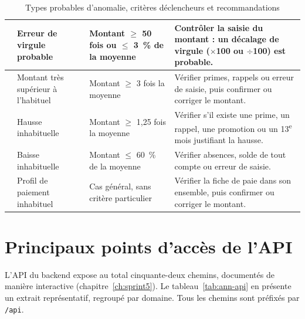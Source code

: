 \begin{table}[H]
\begin{tabularx}{\textwidth}{|>{\centering\arraybackslash}p{0.8cm}|>{\raggedright\arraybackslash}p{3.3cm}|>{\raggedright\arraybackslash}p{3.7cm}|Y|}
 & Erreur de virgule probable & Montant $\geq$ 50 fois ou $\leq$ 3~\% de la moyenne & Contrôler la saisie du montant : un décalage de virgule ($\times$100 ou $\div$100) est probable. \\
 & Montant très supérieur à l'habituel & Montant $\geq$ 3 fois la moyenne & Vérifier primes, rappels ou erreur de saisie, puis confirmer ou corriger le montant. \\
 & Hausse inhabituelle & Montant $\geq$ 1,25 fois la moyenne & Vérifier s'il existe une prime, un rappel, une promotion ou un 13\textsuperscript{e} mois justifiant la hausse. \\
 & Baisse inhabituelle & Montant $\leq$ 60~\% de la moyenne & Vérifier absences, solde de tout compte ou erreur de saisie. \\
 & Profil de paiement inhabituel & Cas général, sans critère particulier & Vérifier la fiche de paie dans son ensemble, puis confirmer ou corriger le montant. \\
\hline
\end{tabularx}
\caption{Types probables d'anomalie, critères déclencheurs et recommandations}
\label{tab:ann-reco}
\end{table}

\chapter{Principaux points d'accès de l'API}
\label{ann:api}

L'API du backend expose au total cinquante-deux chemins, documentés de manière interactive (chapitre~\ref{ch:sprint5}). Le tableau~\ref{tab:ann-api} en présente un extrait représentatif, regroupé par domaine. Tous les chemins sont préfixés par \texttt{/api}.

